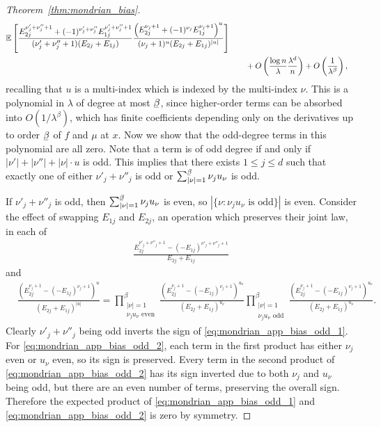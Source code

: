 \begin{proof}[Theorem~\ref{thm:mondrian_bias}]
\begin{align}
    \mathbb{E} \left[
      \frac{E_{2j}^{\nu'_j + \nu''_j + 1}
      + (-1)^{\nu'_j + \nu''_j} E_{1j}^{\nu'_j + \nu''_j + 1}}
      {(\nu'_j + \nu''_j + 1) (E_{2j} + E_{1j})}
      \frac{\left(E_{2j}^{\nu_j + 1}
      + (-1)^{\nu_j} E_{1j}^{\nu_j + 1}\right)^u}
      {(\nu_j + 1)^u (E_{2j} + E_{1j})^{|u|}}
    \right] \\
    \label{eq:mondrian_app_bias}
    &\qquad+
    O \left( \frac{\log n}{\lambda} \frac{\lambda^d}{n} \right)
    + O \left( \frac{1}{\lambda^\beta} \right),
  \end{align}
  recalling that $u$ is a multi-index which is indexed by the multi-index $\nu$.
  This is a polynomial in $\lambda$ of degree at most $\flbeta$,
  since higher-order terms can be absorbed into $O(1 / \lambda^\beta)$,
  which has finite coefficients depending only on
  the derivatives up to order $\flbeta$ of $f$ and $\mu$ at $x$.
  Now we show that the odd-degree terms in this polynomial are all zero.
  Note that a term is of odd degree if and only if
  $|\nu'| + |\nu''| + |\nu| \cdot u$ is odd.
  This implies that there exists $1 \leq j \leq d$ such that
  exactly one of either
  $\nu'_j + \nu''_j$ is odd or
  $\sum_{|\nu|=1}^{\flbeta} \nu_j u_\nu$ is odd.

  If $\nu'_j + \nu''_j$ is odd, then
  $\sum_{|\nu|=1}^{\flbeta} \nu_j u_\nu$ is even, so
  $|\{\nu : \nu_j u_\nu \text{ is odd}\}|$ is even.
  Consider the effect of swapping $E_{1j}$ and $E_{2j}$,
  an operation which preserves their joint law, in each of
  \begin{align}
    \label{eq:mondrian_app_bias_odd_1}
    \frac{E_{2j}^{\nu'_j + \nu''_j + 1}
    - (-E_{1j})^{\nu'_j + \nu''_j + 1}}
    {E_{2j} + E_{1j}}
  \end{align}
  and
  \begin{align}
    \label{eq:mondrian_app_bias_odd_2}
    &\frac{\left(E_{2j}^{\nu_j + 1}
    - (-E_{1j})^{\nu_j + 1}\right)^u}
    {(E_{2j} + E_{1j})^{|u|}}
    = \!\!\!
    \prod_{\substack{|\nu| = 1 \\
    \nu_j u_\nu \text{ even}}}^\beta
    \!\!\!
    \frac{\left(E_{2j}^{\nu_j + 1}
    - (-E_{1j})^{\nu_j + 1}\right)^{u_\nu}}
    {(E_{2j} + E_{1j})^{u_\nu}}
    \!\!\!
    \prod_{\substack{|\nu| = 1 \\
    \nu_j u_\nu \text{ odd}}}^\beta
    \!\!\!
    \frac{\left(E_{2j}^{\nu_j + 1}
    - (-E_{1j})^{\nu_j + 1}\right)^{u_\nu}}
    {(E_{2j} + E_{1j})^{u_\nu}}.
  \end{align}
  Clearly $\nu'_j + \nu''_j$ being odd inverts the
  sign of \eqref{eq:mondrian_app_bias_odd_1}.
  For \eqref{eq:mondrian_app_bias_odd_2},
  each term in the first product has either
  $\nu_j$ even or $u_\nu$ even, so its sign is preserved.
  Every term in the second product of \eqref{eq:mondrian_app_bias_odd_2}
  has its sign inverted due to both $\nu_j$ and $u_\nu$ being odd,
  but there are an even number of terms,
  preserving the overall sign.
  Therefore the expected product
  of \eqref{eq:mondrian_app_bias_odd_1} and \eqref{eq:mondrian_app_bias_odd_2}
  is zero by symmetry.


\end{proof}
